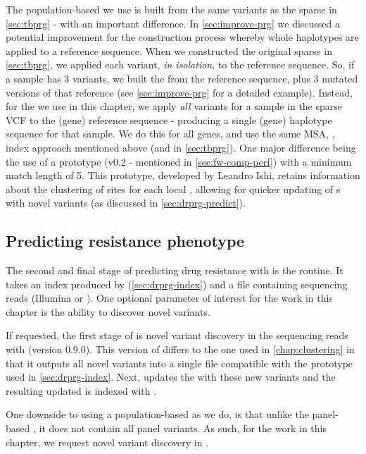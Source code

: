 The population-based \prg{} we use is built from the same variants as the sparse \prg{} in \autoref{sec:tbprg} - with an important difference. In \autoref{sec:improve-prg} we discussed a potential improvement for the \prg{} construction process whereby whole haplotypes are applied to a reference sequence. When we constructed the original sparse \prg{} in \autoref{sec:tbprg}, we applied each variant, \emph{in isolation}, to the reference sequence. So, if a sample has 3 variants, we built the \prg{} from the reference sequence, plus 3 mutated versions of that reference (see \autoref{sec:improve-prg} for a detailed example). Instead, for the \prg{} we use in this chapter, we apply \emph{all} variants for a sample in the sparse VCF to the (gene) reference sequence - producing a single (gene) haplotype sequence for that sample. We do this for all genes, and use the same MSA, \makeprg{}, \pandora{} index approach mentioned above (and in \autoref{sec:tbprg}). One major difference being the use of a \makeprg{} prototype (v0.2 - mentioned in \autoref{sec:fw-comp-perf}) with a minimum match length of 5. This prototype, developed by Leandro Ishi, retains information about the clustering of sites for each local \prg{}, allowing for quicker updating of \prg{}s with novel variants (as discussed in \autoref{sec:drprg-predict}).


\subsection{Predicting resistance phenotype}
\label{sec:drprg-predict}

The second and final stage of predicting drug resistance with \drprg{} is the  routine. It takes an index produced by \drprg{}  (\autoref{sec:drprg-index}) and a file containing sequencing reads (Illumina or \ont{}). One optional parameter of interest for the work in this chapter is the ability to discover novel variants.

If requested, the first stage of \drprg{}  is novel variant discovery in the sequencing reads with \pandora{}  (version 0.9.0). This version of \pandora{} differs to the one used in \autoref{chap:clustering} in that it outputs all novel variants into a single file compatible with the \makeprg{} prototype used in \autoref{sec:drprg-index}. Next, \makeprg{} updates the \drprg{} \prg{} with these new variants and the resulting updated \prg{} is indexed with \pandora{}. 

One downside to using a population-based \prg{} as we do, is that unlike the panel-based \prg{}, it does not contain all panel variants. As such, for the work in this chapter, we request novel variant discovery in \drprg{} .

